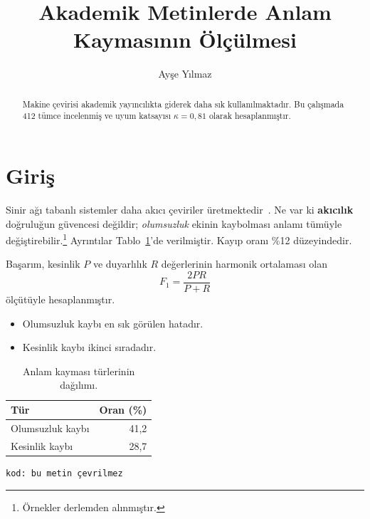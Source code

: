 \documentclass[11pt]{article}
\title{Akademik Metinlerde Anlam Kaymasının Ölçülmesi}
\author{Ayşe Yılmaz}
\begin{document}
\maketitle

\begin{abstract}
Makine çevirisi akademik yayıncılıkta giderek daha sık kullanılmaktadır. Bu çalışmada 412 tümce incelenmiş ve uyum katsayısı $\kappa = 0{,}81$ olarak hesaplanmıştır.
\end{abstract}

\section{Giriş}\label{sec:giris}
Sinir ağı tabanlı sistemler daha akıcı çeviriler üretmektedir~\cite{vaswani2017,koehn2010}.
Ne var ki \textbf{akıcılık} doğruluğun güvencesi değildir; \emph{olumsuzluk} ekinin kaybolması
anlamı tümüyle değiştirebilir.\footnote{Örnekler derlemden alınmıştır.} Ayrıntılar
Tablo~\ref{tab:sonuc}'de verilmiştir. Kayıp oranı \%12 düzeyindedir.

Başarım, kesinlik $P$ ve duyarlılık $R$ değerlerinin harmonik ortalaması olan
\begin{equation}
  F_1 = \frac{2PR}{P+R}
  \label{eq:f1}
\end{equation}
ölçütüyle hesaplanmıştır.

\begin{itemize}
  \item Olumsuzluk kaybı en sık görülen hatadır.
  \item Kesinlik kaybı ikinci sıradadır.
\end{itemize}

\begin{table}[ht]
  \centering
  \caption{Anlam kayması türlerinin dağılımı.}
  \label{tab:sonuc}
  \begin{tabular}{lr}
    \toprule
    Tür & Oran (\%) \\
    \midrule
    Olumsuzluk kaybı & 41,2 \\
    Kesinlik kaybı & 28,7 \\
    \bottomrule
  \end{tabular}
\end{table}

\begin{verbatim}
kod: bu metin çevrilmez
\end{verbatim}



\end{document}
